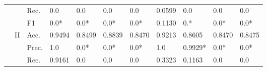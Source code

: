 \begin{tabular}{cclllllllll}
                                                                                                               &                                   & Rec.                                                 & 0.0                     & 0.0                     & 0.0                          & 0.0                     & 0.0599                                                                       & 0.0                                                                         & 0.0                                       & 0.0                                       \\
                                                                                                               &                                   & F1                                                   & 0.0*                    & 0.0*                    & 0.0*                         & 0.0*                    & 0.1130                                                                       & 0.*                                                                         & 0.0*                                      & 0.0*                                      \\ 
    \cmidrule{2-11}
                                                                                                               & \multirow{4}{*}{II}               & Acc.                                                 & 0.9494                  & 0.8499                  & 0.8839                       & 0.8470                  & 0.9213                                                                       & 0.8605                                                                      & 0.8470                                    & 0.8475                                    \\
                                                                                                               &                                   & Prec.                                                & 1.0                     & 0.0*                    & 0.0*                         & 0.0*                    & 1.0                                                                          & 0.9929*                                                                     & 0.0*                                      & 0.0*                                      \\
                                                                                                               &                                   & Rec.                                                 & 0.9161                  & 0.0                     & 0.0                          & 0.0                     & 0.3323                                                                       & 0.1163                                                                      & 0.0                                       & 0.0                                       \\

\end{tabular}
